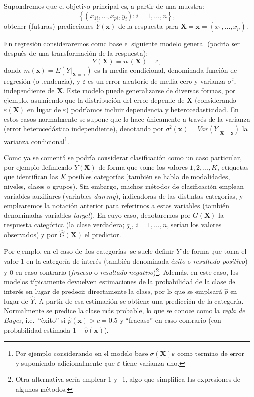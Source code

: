 \documentclass[
]{book}
\theoremstyle{break}
\theoremstyle{nonumberplain}
\begin{document}
Supondremos que el objetivo principal es, a partir de una muestra: \[\left\{ \left( x_{1i}, \ldots, x_{pi}, y_{i} \right)  : i = 1, \ldots, n \right\},\] obtener (futuras) predicciones \(\hat Y\left(\mathbf{x} \right)\) de la respuesta para \(\mathbf{X}=\mathbf{x}=\left(x_{1}, \ldots, x_{p}\right)\).

En regresión consideraremos como base el siguiente modelo general (podría ser después de una transformación de la respuesta):
\begin{equation} 
  Y(\mathbf{X})=m(\mathbf{X})+\varepsilon,
  \label{eq:modelogeneral}
\end{equation}
donde \(m(\mathbf{x}) = E\left( \left. Y\right\vert_{\mathbf{X}=\mathbf{x}} \right)\) es la media condicional, denominada función de regresión (o tendencia), y \(\varepsilon\) es un error aleatorio de media cero y varianza \(\sigma^2\), independiente de \(\mathbf{X}\).
Este modelo puede generalizarse de diversas formas, por ejemplo, asumiendo que la distribución del error depende de \(\mathbf{X}\) (considerando \(\varepsilon(\mathbf{X})\) en lugar de \(\varepsilon\)) podríamos incluir dependencia y heterocedasticidad.
En estos casos normalmente se supone que lo hace únicamente a través de la varianza (error heterocedástico independiente), denotando por \(\sigma^2(\mathbf{x}) = Var\left( \left. Y\right\vert_{\mathbf{X}=\mathbf{x}} \right)\) la varianza condicional\footnote{Por ejemplo considerando en el modelo base \(\sigma(\mathbf{X})\varepsilon\) como termino de error y suponiendo adicionalmente que \(\varepsilon\) tiene varianza uno.}.

Como ya se comentó se podría considerar clasificación como un caso particular, por ejemplo definiendo \(Y\left(\mathbf{X} \right)\) de forma que tome los valores \(1, 2, \ldots, K\), etiquetas que identifican las \(K\) posibles categorías (también se habla de modalidades, niveles, clases o grupos).
Sin embargo, muchos métodos de clasificación emplean variables auxiliares (variables \emph{dummy}), indicadoras de las distintas categorías, y emplearemos la notación anterior para referirnos a estas variables (también denominadas variables \emph{target}).
En cuyo caso, denotaremos por \(G \left(\mathbf{X} \right)\) la respuesta categórica (la clase verdadera; \(g_i\), \(i =1, \ldots, n\), serían los valores observados) y por \(\hat G \left(\mathbf{X} \right)\) el predictor.

Por ejemplo, en el caso de dos categorías, se suele definir \(Y\) de forma que toma el valor 1 en la categoría de interés (también denominada \emph{éxito} o \emph{resultado positivo}) y 0 en caso contrario (\emph{fracaso} o \emph{resultado negativo})\footnote{Otra alternativa sería emplear 1 y -1, algo que simplifica las expresiones de algunos métodos.}.
Además, en este caso, los modelos típicamente devuelven estimaciones de la probabilidad de la clase de interés en lugar de predecir directamente la clase, por lo que se empleará \(\hat p\) en lugar de \(\hat Y\).
A partir de esa estimación se obtiene una predicción de la categoría.
Normalmente se predice la clase más probable, lo que se conoce como la \emph{regla de Bayes}, i.e.~``éxito'' si \(\hat p(\mathbf{x}) > c = 0.5\) y ``fracaso'' en caso contrario (con probabilidad estimada \(1 - \hat p(\mathbf{x})\)).
\end{document}
